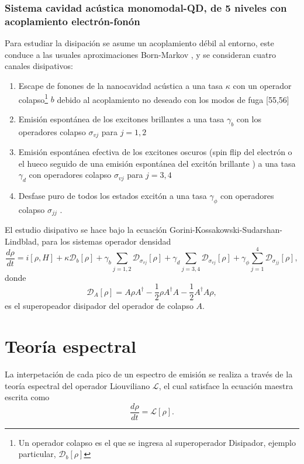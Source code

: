 \documentclass[../main.tex]{subfiles}
\begin{document}
\subsubsection{Sistema cavidad acústica monomodal-QD, de 5 niveles con acoplamiento electrón-fonón}
Para estudiar la disipación se asume un acoplamiento débil al entorno, este conduce a las usuales aproximaciones Born-Markov \parencite{Breuer2007}, y se consideran cuatro canales disipativos:
\begin{enumerate}
	\item Escape de fonones de la nanocavidad acústica a una tasa $\kappa$ con un operador colapso\footnote{Un operador colapso es el que se ingresa al superoperador Disipador, ejemplo particular, $\mathcal{D}_b[\rho]$} $b$ debido al acoplamiento no deseado con los modos de fuga [55,56]
	\item Emisión espontánea de los excitones brillantes a una tasa $\gamma_b$ con los operadores colapso $\sigma_{vj}$ para $j=1,2$
	\item Emisión espontánea efectiva de los excitones oscuros (spin flip del electrón o el hueco seguido de una emisión espontánea del excitón brillante \parencite{Crooker2003}) a una tasa $\gamma_d$ con operadores colapso $\sigma_{vj}$ para $j=3,4$
	\item Desfase puro de todos los estados excitón a una tasa $\gamma_\phi$ con operadores colapso $\sigma_{jj}$ \parencite{Takagahara2002}.
\end{enumerate}

El estudio disipativo se hace bajo la ecuación Gorini-Kossakowski-Sudarshan-Lindblad, para los sistemas operador densidad
\begin{equation}\label{eq:dissipativeMasterEquation}
	\frac{d\rho}{dt} = i[\rho,H] + \kappa \mathcal{D}_b[\rho] + \gamma_b \sum_{j=1,2} \mathcal{D}_{\sigma_{vj}}[\rho] + \gamma_d \sum_{j=3,4} \mathcal{D}_{\sigma_{vj}}[\rho] + \gamma_\phi \sum_{j=1}^4 \mathcal{D}_{\sigma_{jj}}[\rho],
\end{equation}
donde
\begin{equation}
	\mathcal{D}_A[\rho] = A\rho A^\dagger - \frac{1}{2} \rho A^\dagger A - \frac{1}{2} A^\dagger A \rho,
\end{equation}
es el superopeador disipador del operador de colapso $A$.

\section{Teoría espectral}\label{sec:spectralTheory}
La interpetación de cada pico de un espectro de emisión se realiza a través de la teoría espectral del operador Liouviliano $\mathcal{L}$, el cual satisface la ecuación maestra escrita como \parencite{Manzano2018}
\begin{equation}
	\frac{d\rho}{dt} = \mathcal{L}[\rho].
\end{equation}
\end{document}
